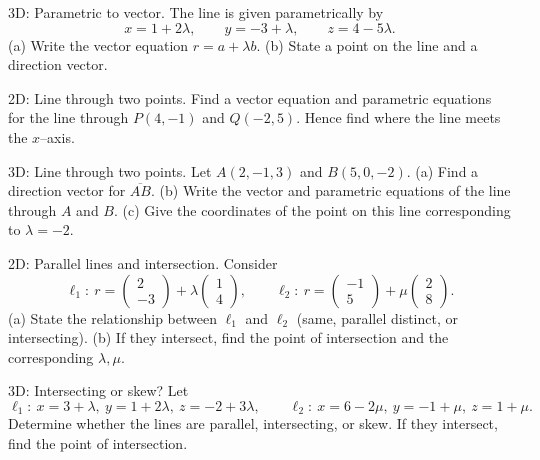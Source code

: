 \documentclass[11pt]{article}
\def\textbf#1{#1}%
\def\mathbf#1{#1}%
\newcounter{question}
\begin{document}
\begin{question}
\textbf{3D: Parametric to vector.}
The line is given parametrically by
\[
x=1+2\lambda,\qquad y=-3+\lambda,\qquad z=4-5\lambda.
\]
(a) Write the vector equation $\mathbf{r}=\mathbf{a}+\lambda\mathbf{b}$. (b) State a point on the line and a direction vector.
\end{question}

\begin{question}
\textbf{2D: Line through two points.}
Find a vector equation and parametric equations for the line through $P(4,-1)$ and $Q(-2,5)$. Hence find where the line meets the $x$–axis.
\end{question}

\begin{question}
\textbf{3D: Line through two points.}
Let $A(2,-1,3)$ and $B(5,0,-2)$.  
(a) Find a direction vector for $\overline{AB}$.  
(b) Write the vector and parametric equations of the line through $A$ and $B$.  
(c) Give the coordinates of the point on this line corresponding to $\lambda=-2$.
\end{question}

\begin{question}
\textbf{2D: Parallel lines and intersection.}
Consider
\[
\ell_1:\ \mathbf{r}=\begin{pmatrix}2\\-3\end{pmatrix}+\lambda\begin{pmatrix}1\\4\end{pmatrix},
\qquad
\ell_2:\ \mathbf{r}=\begin{pmatrix}-1\\5\end{pmatrix}+\mu\begin{pmatrix}2\\8\end{pmatrix}.
\]
(a) State the relationship between $\ell_1$ and $\ell_2$ (same, parallel distinct, or intersecting).  
(b) If they intersect, find the point of intersection and the corresponding $\lambda,\mu$.
\end{question}

\begin{question}
\textbf{3D: Intersecting or skew?}
Let
\[
\ell_1:\ x=3+\lambda,\ y=1+2\lambda,\ z=-2+3\lambda,\qquad
\ell_2:\ x=6-2\mu,\ y=-1+\mu,\ z=1+\mu.
\]
Determine whether the lines are parallel, intersecting, or skew. If they intersect, find the point of intersection.
\end{question}
\end{document}

